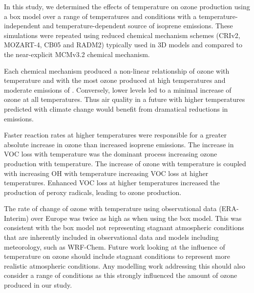 In this study, we determined the effects of temperature on ozone production using a box model over a range of temperatures and  conditions with a temperature-independent and temperature-dependent source of isoprene emissions.
These simulations were repeated using reduced chemical mechanism schemes (CRIv2, MOZART-4, CB05 and RADM2) typically used in 3D models and compared to the near-explicit MCMv3.2 chemical mechanism.

Each chemical mechanism produced a non-linear relationship of ozone with temperature and  with the most ozone produced at high temperatures and moderate emissions of .
Conversely, lower  levels led to a minimal increase of ozone at all temperatures.
Thus air quality in a future with higher temperatures predicted with climate change would benefit from dramatical reductions in  emissions.

Faster reaction rates at higher temperatures were responsible for a greater absolute increase in ozone than increased isoprene emissions.
The increase in VOC loss with temperature was the dominant process increasing ozone production with temperature.
The increase of ozone with temperature is coupled with increasing OH with temperature increasing VOC loss at higher temperatures.
Enhanced VOC loss at higher temperatures increased the production of peroxy radicals, leading to ozone production.

The rate of change of ozone with temperature using observational data (ERA-Interim) over Europe was twice as high as when using the box model.
This was consistent with the box model not representing stagnant atmospheric conditions that are inherently included in observational data and models including meteorology, such as WRF-Chem.
Future work looking at the influence of temperature on ozone should include stagnant conditions to represent more realistic atmospheric conditions.
Any modelling work addressing this should also consider a range of  conditions as this strongly influenced the amount of ozone produced in our study.
